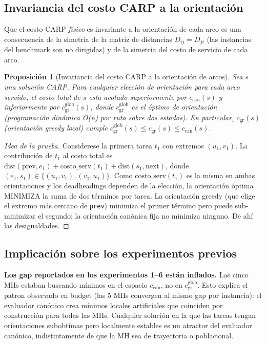 \documentclass[11pt,a4paper]{article}
\newtheorem{proposicion}[teorema]{Proposición}
\theoremstyle{definition}
\theoremstyle{remark}
\begin{document}
\subsection{Invariancia del costo CARP a la orientación}

Que el costo CARP \emph{físico} es invariante a la orientación de cada
arco es una consecuencia de la simetria de la matriz de distancias
$D_{ij} = D_{ji}$ (las instancias del benchmark son no dirigidas) y de
la simetria del costo de servicio de cada arco.

\begin{proposicion}[Invariancia del costo CARP a la orientación de arcos]
\label{prop:invariancia}
Sea $s$ una solución CARP. Para cualquier elección de orientación para
cada arco servido, el costo total de $s$ esta acotado superiormente por
$c_{\text{can}}(s)$ y inferiormente por $c_{\text{gr}}^{\text{glob}}(s)$,
donde $c_{\text{gr}}^{\text{glob}}$ es el óptimo de orientación
(programación dinámica O(n) por ruta sobre dos estados). En particular,
$c_{\text{gr}}(s)$ (orientación greedy local) cumple
$c_{\text{gr}}^{\text{glob}}(s) \le c_{\text{gr}}(s) \le c_{\text{can}}(s)$.
\end{proposicion}

\begin{proof}[Idea de la prueba]
Considerese la primera tarea $t_1$ con extremos $(u_1, v_1)$. La
contribución de $t_1$ al costo total es $\mathrm{dist}(\text{prev}, e_1) +
\mathrm{costo\_serv}(t_1) + \mathrm{dist}(s_1, \text{next})$, donde
$(e_1, s_1) \in \{(u_1, v_1), (v_1, u_1)\}$. Como
$\mathrm{costo\_serv}(t_1)$ es la misma en ambas orientaciones y los
deadheadings dependen de la elección, la orientación óptima MINIMIZA la
suma de dos términos por tarea. La orientación greedy (que elige el
extremo más cercano de \texttt{prev}) minimiza el primer término pero
puede sub-minimizar el segundo; la orientación canónica fija no
minimiza ninguno. De ahí las desigualdades.
\end{proof}

\subsection{Implicación sobre los experimentos previos}

\textbf{Los gap reportados en los experimentos 1--6 están inflados.}
Las cinco MHs estaban buscando mínimos en el espacio
$c_{\text{can}}$, no en $c_{\text{gr}}^{\text{glob}}$. Esto explica el
patron observado en budget (las 5 MHs convergen al mismo gap por
instancia): el evaluador canónico crea mínimos locales artificiales
que coinciden por construcción para todas las MHs. Cualquier solución
en la que las tareas tengan orientaciones subobtimas pero localmente
estables es un atractor del evaluador canónico, indistintamente de
que la MH sea de trayectoria o poblacional.
\end{document}
